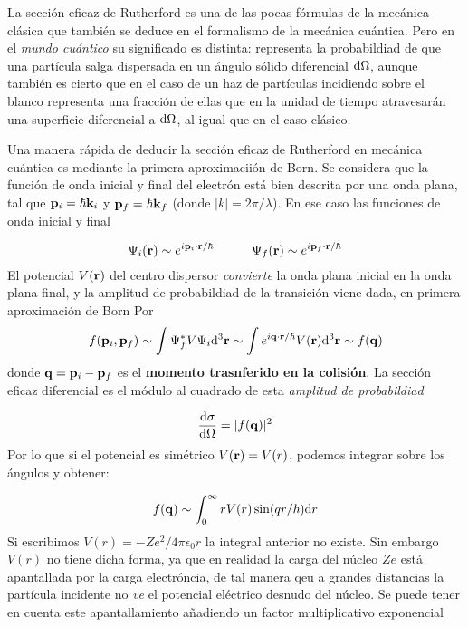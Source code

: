 La sección eficaz de Rutherford es una de las pocas fórmulas de la mecánica clásica que también se deduce en el formalismo de la mecánica cuántica. Pero en el \textit{mundo cuántico} su significado es distinta: representa la probabildiad de que una partícula salga dispersada en un ángulo sólido diferencial $\mathrm{d} \Omega$, aunque también es cierto que en el caso de un haz de partículas incidiendo sobre el blanco representa una fracción de ellas que en la unidad de tiempo atravesarán una superficie diferencial a $\mathrm{d} \Omega$, al igual que en el caso clásico.

Una manera rápida de deducir la sección eficaz de Rutherford en mecánica cuántica es mediante la primera aproximaciión de Born. Se considera que la función de onda inicial y final del electrón está bien descrita por una onda plana, tal que $\mathbf{p}_i=\hbar \mathbf{k}_i$ y $\mathbf{p}_f = \hbar \mathbf{k}_f$ (donde $|k|=2\pi / \lambda$).  En ese caso las funciones de onda inicial y final

\begin{equation}
	\Psi_i (\mathbf{r}) \sim e^{i \mathbf{p}_i \cdot \mathbf{r} / \hbar} \quad \quad \quad \Psi_f (\mathbf{r}) \sim e^{i \mathbf{p}_f \cdot \mathbf{r} / \hbar}
\end{equation}
El potencial $V(\mathbf{r})$ del centro dispersor \textit{convierte} la onda plana inicial en la onda plana final, y la amplitud de probabildiad de la transición viene dada, en primera aproximación de Born Por
\begin{equation}
	f(\mathbf{p}_i,\mathbf{p}_f) \sim \int \Psi_f^* V \Psi_i \mathrm{d}^3 \mathbf{r} \sim \int e^{i \mathbf{q} \cdot \mathbf{r} / \hbar} V(\mathbf{r}) \mathrm{d}^3 \mathbf{r} \sim f(\mathbf{q})
\end{equation}
donde $\mathbf{q}=\mathbf{p}_i - \mathbf{p}_f$ es el \textbf{momento trasnferido en la colisión}. La sección eficaz diferencial es el módulo al cuadrado de esta \textit{amplitud de probabildiad}

\begin{equation}
	\frac{\mathrm{d} \sigma}{\mathrm{d} \Omega} = | f(\mathbf{q}) |^2
\end{equation}
Por lo que si el potencial es simétrico $V(\mathbf{r})=V(r)$, podemos integrar sobre los ángulos y obtener:

\begin{equation}
	f(\mathbf{q}) \sim \int_0^\infty r V(r) \sin (qr/\hbar) \mathrm{d} r
\end{equation}
Si escribimos $V(r)=-Ze^2/4\pi \epsilon_0 r$ la integral anterior no existe. Sin embargo $V(r)$ no tiene dicha forma, ya que en realidad la carga del núcleo $Ze$ está apantallada por la carga electróncia, de tal manera qeu a grandes distancias la partícula incidente no \textit{ve} el potencial eléctrico desnudo del núcleo. Se puede tener en cuenta este apantallamiento añadiendo un factor multiplicativo exponencial


